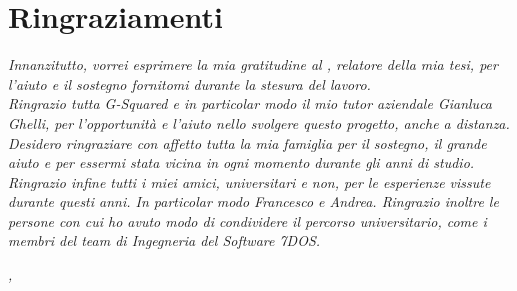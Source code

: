
\cleardoublepage
{}
{}


\bigskip

\begingroup
\let\clearpage\relax
\let\cleardoublepage\relax
\let\cleardoublepage\relax

\chapter*{Ringraziamenti}

\noindent \textit{Innanzitutto, vorrei esprimere la mia gratitudine al \profTitle \myProf, relatore della mia tesi, per l'aiuto e il sostegno fornitomi durante la stesura del lavoro.}\\

\noindent \textit{Ringrazio tutta G-Squared e in particolar modo il mio tutor aziendale Gianluca Ghelli, per l'opportunità e l'aiuto nello svolgere questo progetto, anche a distanza.}\\

\noindent \textit{Desidero ringraziare con affetto tutta la mia famiglia per il sostegno, il grande aiuto e per essermi stata vicina in ogni momento durante gli anni di studio.}\\

\noindent \textit{Ringrazio infine tutti i miei amici, universitari e non, per le esperienze vissute durante questi anni. In particolar modo Francesco e Andrea. Ringrazio inoltre le persone con cui ho avuto modo di condividere il percorso universitario, come i membri del team di Ingegneria del Software 7DOS.}\\
\bigskip

\noindent\textit{\myLocation, \myTime}
\hfill \myName

\endgroup

